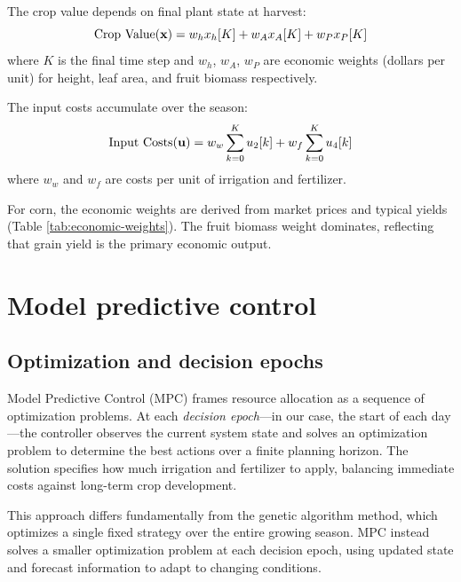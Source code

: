 \documentclass[preprint,12pt]{elsarticle}
\begin{document}
The crop value depends on final plant state at harvest:
\begin{equation}
\text{Crop Value}({\bf x}) = w_{h}x_{h}[K] + w_{A}x_{A}[K] + w_{P}x_{P}[K]
\label{eqn:crop-value}
\end{equation}
where $K$ is the final time step and $w_{h}$, $w_{A}$, $w_{P}$ are economic weights (dollars per unit) for height, leaf area, and fruit biomass respectively.

The input costs accumulate over the season:
\begin{equation}
\text{Input Costs}({\bf u}) = w_{w}\sum_{k=0}^{K}u_{2}[k] + w_{f}\sum_{k=0}^{K}u_{4}[k]
\label{eqn:input-costs}
\end{equation}
where $w_{w}$ and $w_{f}$ are costs per unit of irrigation and fertilizer.

For corn, the economic weights are derived from market prices and typical yields (Table \ref{tab:economic-weights}). The fruit biomass weight dominates, reflecting that grain yield is the primary economic output.

\section{Model predictive control}\label{sec:mpc}

\subsection{Optimization and decision epochs}\label{subsec:optimization}

Model Predictive Control (MPC) frames resource allocation as a sequence of optimization problems. At each \emph{decision epoch}---in our case, the start of each day---the controller observes the current system state and solves an optimization problem to determine the best actions over a finite planning horizon. The solution specifies how much irrigation and fertilizer to apply, balancing immediate costs against long-term crop development.

This approach differs fundamentally from the genetic algorithm method, which optimizes a single fixed strategy over the entire growing season. MPC instead solves a smaller optimization problem at each decision epoch, using updated state and forecast information to adapt to changing conditions.
\end{document}
